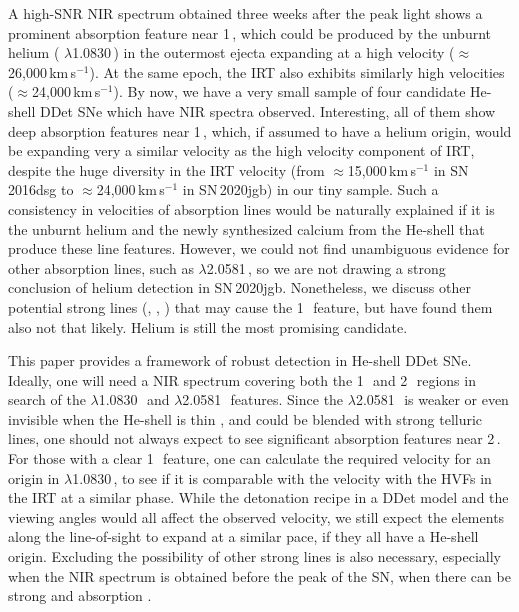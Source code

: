 \documentclass[twocolumn]{aastex631}
\newcommand{\sn}{SN\,2020jgb}
\begin{document}
A high-SNR NIR spectrum obtained three weeks after the peak light shows a prominent absorption feature near 1\,\micron, which could be produced by the unburnt helium ( $\lambda$1.0830\,\micron) in the outermost ejecta expanding at a high velocity ($\approx$26,000\,km\,s$^{-1}$). At the same epoch, the  IRT also exhibits similarly high velocities ($\approx$24,000\,km\,s$^{-1}$). By now, we have a very small sample of four candidate He-shell DDet SNe which have NIR spectra observed. Interesting, all of them show deep absorption features near 1\,\micron, which, if assumed to have a helium origin, would be expanding very a similar velocity as the high velocity component of  IRT, despite the huge diversity in the  IRT velocity (from $\approx$15,000\,km\,s$^{-1}$ in SN\,2016dsg to $\approx$24,000\,km\,s$^{-1}$ in \sn) in our tiny sample. Such a consistency in velocities of absorption lines would be naturally explained if it is the unburnt helium and the newly synthesized calcium from the He-shell that produce these line features. However, we could not find unambiguous evidence for other  absorption lines, such as  $\lambda$2.0581\,\micron, so we are not drawing a strong conclusion of helium detection in \sn. Nonetheless, we discuss other potential strong lines (, , ) that may cause the 1\,\micron\ feature, but have found them also not that likely. Helium is still the most promising candidate.

This paper provides a framework of robust  detection in He-shell DDet SNe. Ideally, one will need a NIR spectrum covering both the 1\,\micron\ and 2\,\micron\ regions in search of the  $\lambda$1.0830\,\micron\ and $\lambda$2.0581\,\micron\ features. Since the  $\lambda$2.0581\,\micron\ is weaker or even invisible when the He-shell is thin \citep{Boyle2017_Helium}, and could be blended with strong telluric lines, one should not always expect to see significant absorption features near 2\,\micron. For those with a clear 1\,\micron\ feature, one can calculate the required velocity for an origin in  $\lambda$1.0830\,\micron, to see if it is comparable with the velocity with the HVFs in the  IRT at a similar phase. While the detonation recipe in a DDet model and the viewing angles would all affect the observed  velocity, we still expect the elements along the line-of-sight to expand at a similar pace, if they all have a He-shell origin. Excluding the possibility of other strong lines is also necessary, especially when the NIR spectrum is obtained before the peak of the SN, when there can be strong  and  absorption \citep{Hsiao_CSP_2019}.
\end{document}
